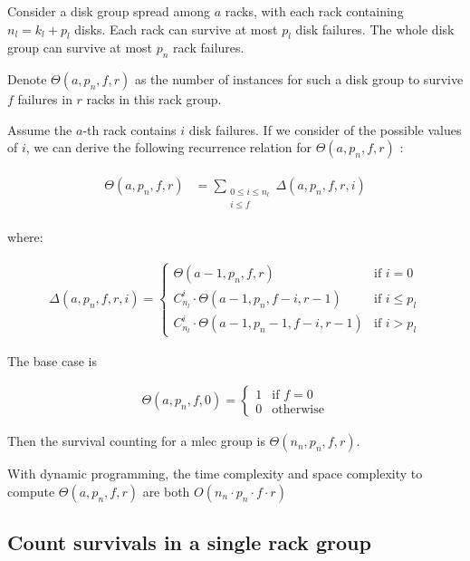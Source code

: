 \documentclass{article}
\begin{document}
Consider a disk group spread among $a$ racks, with each rack containing $n_l=k_l+p_l$ disks. Each rack can survive at most $p_l$ disk failures.
The whole disk group can survive at most $p_n$ rack failures. 

Denote $\Theta(a,p_n,f,r)$ as the number of instances for such a disk group to survive $f$ failures in $r$ racks in this rack group.

Assume the $a$-th rack contains $i$ disk failures. 
If we consider of the possible values of $i$, we can derive the following recurrence relation for $\Theta(a,p_n,f,r)$ :

\begin{eqnarray}
\begin{aligned}
  \Theta(a,p_n,f,r) &= \sum_{\substack{0 \leq i \leq n_l \\ i\leq f}} 
                \Delta(a,p_n,f,r, i)
\end{aligned}
\label{eq:mlec:1}
\end{eqnarray}

where:

\begin{eqnarray}
  \Delta(a,p_n,f,r, i) =
    \begin{cases}
      \Theta(a-1,p_n,f,r) & \text{if $i = 0$}\\
      C_{n_l}^{i} \cdot \Theta(a-1,p_n,f-i,r-1) & \text{if $i \leq p_l$} \\ 
      C_{n_l}^{i} \cdot \Theta(a-1,p_n-1,f-i,r-1) & \text{if $i > p_l$}
    \end{cases}       
\label{eq:mlec:2}
\end{eqnarray}



The base case is 

\begin{eqnarray}
  \Theta(a,p_n,f,0) =
    \begin{cases}
      1 & \text{if $f=0$}\\
      0 & \text{otherwise}
    \end{cases}       
\label{eq:mlec:3}
\end{eqnarray}

Then the survival counting for a mlec group is $\Theta(n_n,p_n,f,r)$.

With dynamic programming, the time complexity and space complexity to compute $\Theta(a,p_n,f,r)$ are both $O(n_n \cdot p_n \cdot f \cdot r)$

\subsection{Count survivals in a single rack group}
\end{document}
